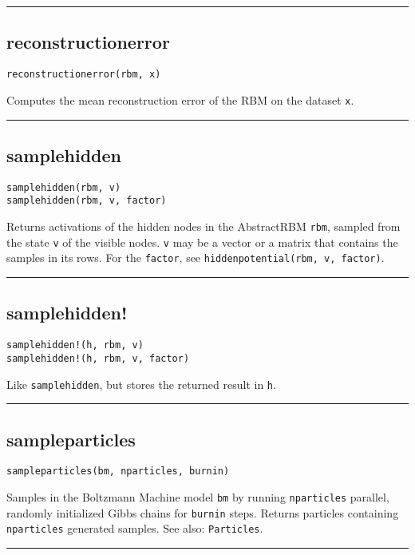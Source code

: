 \noindent\rule{\textwidth}{1pt}
\subsection*{reconstructionerror}
\begin{verbatim}
reconstructionerror(rbm, x)
\end{verbatim}
Computes the mean reconstruction error of the RBM on the dataset \texttt{x}.

\noindent\rule{\textwidth}{1pt}
\subsection*{samplehidden}
\begin{verbatim}
samplehidden(rbm, v)
samplehidden(rbm, v, factor)
\end{verbatim}
Returns activations of the hidden nodes in the AbstractRBM \texttt{rbm}, sampled from the state \texttt{v} of the visible nodes. \texttt{v} may be a vector or a matrix that contains the samples in its rows. For the \texttt{factor}, see \texttt{hiddenpotential(rbm, v, factor)}.

\noindent\rule{\textwidth}{1pt}
\subsection*{samplehidden!}
\begin{verbatim}
samplehidden!(h, rbm, v)
samplehidden!(h, rbm, v, factor)
\end{verbatim}
Like \texttt{samplehidden}, but stores the returned result in \texttt{h}.

\noindent\rule{\textwidth}{1pt}
\subsection*{sampleparticles}
\begin{verbatim}
sampleparticles(bm, nparticles, burnin)
\end{verbatim}
Samples in the Boltzmann Machine model \texttt{bm} by running \texttt{nparticles} parallel, randomly initialized Gibbs chains for \texttt{burnin} steps. Returns particles containing \texttt{nparticles} generated samples. See also: \texttt{Particles}.

\noindent\rule{\textwidth}{1pt}
